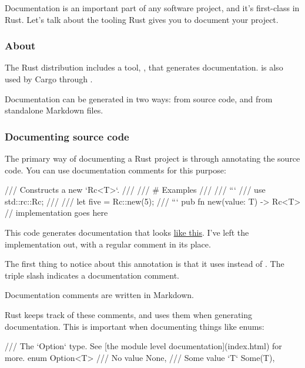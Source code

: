 Documentation is an important part of any software project, and it's first-class in Rust. Let's talk about the tooling Rust gives 
you to document your project.

\subsubsection*{About }

The Rust distribution includes a tool, , that generates documentation.  is also used by Cargo through 
.

\blank

Documentation can be generated in two ways: from source code, and from standalone Markdown files.

\subsubsection*{Documenting source code}

The primary way of documenting a Rust project is through annotating the source code. You can use documentation comments for this purpose:

\begin{rustc}
/// Constructs a new `Rc<T>`.
///
/// # Examples
///
/// ```
/// use std::rc::Rc;
///
/// let five = Rc::new(5);
/// ```
pub fn new(value: T) -> Rc<T> {
    // implementation goes here
}
\end{rustc}

This code generates documentation that looks \href{https://doc.rust-lang.org/nightly/std/rc/struct.Rc.html#method.new}{like this}. 
I've left the implementation out, with a regular comment in its place.

\blank

The first thing to notice about this annotation is that it uses \code{///} instead of \code{//}. The triple slash indicates a 
documentation comment.

\blank

Documentation comments are written in Markdown.

\blank

Rust keeps track of these comments, and uses them when generating documentation. This is important when documenting things like enums:

\begin{rustc}
/// The `Option` type. See [the module level documentation](index.html) for more.
enum Option<T> {
    /// No value
    None,
    /// Some value `T`
    Some(T),
}
\end{rustc}

